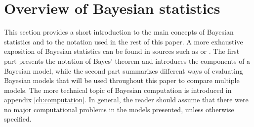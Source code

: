 \section{Overview of Bayesian statistics}

This section provides a short introduction to the main concepts of Bayesian statistics and to the notation used in the rest of this paper.
A more exhaustive exposition of Bayesian statistics can be found in sources such as \cite{gelman_bayesian_2014} or \cite{mcelreath_statistical_2020}.
The first part presents the notation of Bayes' theorem and introduces the components of a Bayesian model, while the second part summarizes different ways of evaluating Bayesian models that will be used throughout this paper to compare multiple models.
The more technical topic of Bayesian computation is introduced in appendix \ref{ch:computation}.
In general, the reader should assume that there were no major computational problems in the models presented, unless otherwise specified.




